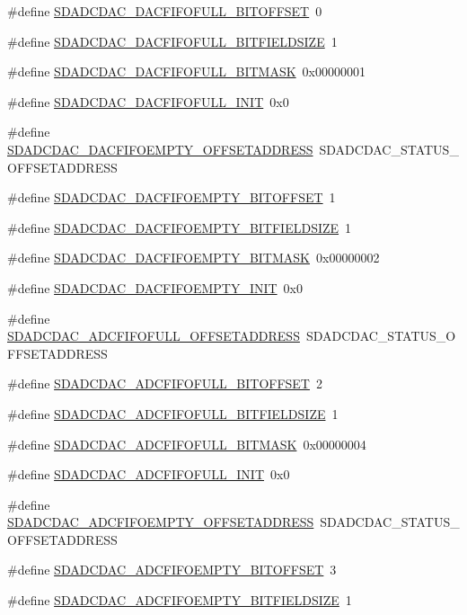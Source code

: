 \begin{DoxyCompactItemize}
\item 
\#define \hyperlink{a00569_a8283da609e396c83ccea45b60bb37ebc}{SDADCDAC\_\-DACFIFOFULL\_\-BITOFFSET}~0
\item 
\#define \hyperlink{a00569_afec6126396967b0168539bec016ab87c}{SDADCDAC\_\-DACFIFOFULL\_\-BITFIELDSIZE}~1
\item 
\#define \hyperlink{a00569_a43e5e89e3a79b872d4e96759934b6f86}{SDADCDAC\_\-DACFIFOFULL\_\-BITMASK}~0x00000001
\item 
\#define \hyperlink{a00569_a62932d285b5420bde4cd359d5e6dbcd1}{SDADCDAC\_\-DACFIFOFULL\_\-INIT}~0x0
\item 
\#define \hyperlink{a00569_a9ec6b1e506e5891045e7f97f59c3989f}{SDADCDAC\_\-DACFIFOEMPTY\_\-OFFSETADDRESS}~SDADCDAC\_\-STATUS\_\-OFFSETADDRESS
\item 
\#define \hyperlink{a00569_af413c63c01e178308b8f305aca8c1e74}{SDADCDAC\_\-DACFIFOEMPTY\_\-BITOFFSET}~1
\item 
\#define \hyperlink{a00569_af09df9c041e74b051dd8f71b1ec0b2b8}{SDADCDAC\_\-DACFIFOEMPTY\_\-BITFIELDSIZE}~1
\item 
\#define \hyperlink{a00569_a410d7b99f835b8b3cb1ea2ba50741b9e}{SDADCDAC\_\-DACFIFOEMPTY\_\-BITMASK}~0x00000002
\item 
\#define \hyperlink{a00569_a7af02d33de4c79935f18cdd12b689124}{SDADCDAC\_\-DACFIFOEMPTY\_\-INIT}~0x0
\item 
\#define \hyperlink{a00569_aa5ca69420e7a0952b3df30b5938e9eb4}{SDADCDAC\_\-ADCFIFOFULL\_\-OFFSETADDRESS}~SDADCDAC\_\-STATUS\_\-OFFSETADDRESS
\item 
\#define \hyperlink{a00569_a61f39490a69700f078a31866e8a6ce24}{SDADCDAC\_\-ADCFIFOFULL\_\-BITOFFSET}~2
\item 
\#define \hyperlink{a00569_af1854ca27e9789655a3d915ce4d0f004}{SDADCDAC\_\-ADCFIFOFULL\_\-BITFIELDSIZE}~1
\item 
\#define \hyperlink{a00569_a3fc383aa85186fc47ce6516cb1b97f57}{SDADCDAC\_\-ADCFIFOFULL\_\-BITMASK}~0x00000004
\item 
\#define \hyperlink{a00569_a3eb153323e66546d6cfc0d385b05e773}{SDADCDAC\_\-ADCFIFOFULL\_\-INIT}~0x0
\item 
\#define \hyperlink{a00569_ab15bd537759851efc52871c6e949b6ba}{SDADCDAC\_\-ADCFIFOEMPTY\_\-OFFSETADDRESS}~SDADCDAC\_\-STATUS\_\-OFFSETADDRESS
\item 
\#define \hyperlink{a00569_a9e9ea811343b13c2b1cae3fdae5d9ddd}{SDADCDAC\_\-ADCFIFOEMPTY\_\-BITOFFSET}~3
\item 
\#define \hyperlink{a00569_adfa3aac22c1c16010c674988a767346c}{SDADCDAC\_\-ADCFIFOEMPTY\_\-BITFIELDSIZE}~1

\end{DoxyCompactItemize}
